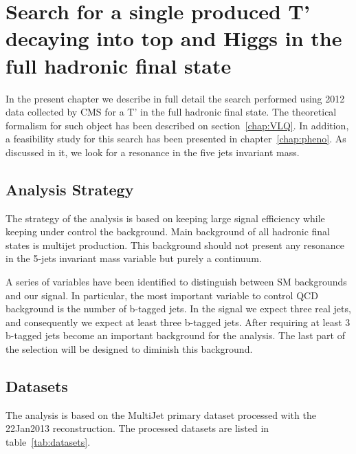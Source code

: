 \chapter[Single VLQ search]{Search for a single produced T' decaying into top and Higgs in the full hadronic final state}
\label{chap:search}

In the present chapter we describe in full detail the search performed using 2012 data collected by CMS for a T' in the full hadronic final state. The theoretical formalism for such object has been described on section~\ref{chap:VLQ}. In addition, a feasibility study for this search has been presented in chapter~\ref{chap:pheno}. As discussed in it, we look for a resonance in the five jets invariant mass.

\section{Analysis Strategy}
\label{sec:stra}

The strategy of the analysis is based on keeping large signal efficiency while keeping under control the background. Main background of all hadronic final states is multijet production. This background should not present any resonance in the 5-jets invariant mass variable but purely a continuum. %

A series of variables have been identified to distinguish between SM backgrounds and our signal. In particular, the most important variable to control QCD background is the number of b-tagged jets. In the signal we expect three real jets, and consequently we expect at least three b-tagged jets. After requiring at least 3 b-tagged jets \ttbar become an important background for the analysis. The last part of the selection will be designed to diminish this background. 

\section{Datasets}
\label{sec:data}

The analysis is based on the MultiJet primary dataset processed with the 22Jan2013 reconstruction. The processed datasets are listed in table~\ref{tab:datasets}.

